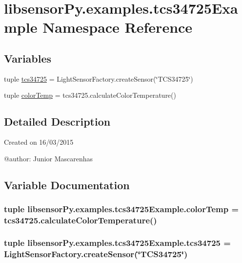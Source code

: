 \hypertarget{namespacelibsensorPy_1_1examples_1_1tcs34725Example}{}\section{libsensor\+Py.\+examples.\+tcs34725\+Example Namespace Reference}
\label{namespacelibsensorPy_1_1examples_1_1tcs34725Example}
\subsection*{Variables}
\begin{DoxyCompactItemize}
\item 
tuple \hyperlink{namespacelibsensorPy_1_1examples_1_1tcs34725Example_a263b5d30fd9292ed536653daa5a21f87}{tcs34725} = Light\+Sensor\+Factory.\+create\+Sensor(\char`\"{}T\+C\+S34725\char`\"{})
\item 
tuple \hyperlink{namespacelibsensorPy_1_1examples_1_1tcs34725Example_a19f4690c620a1ffea053bf068d11011b}{color\+Temp} = tcs34725.\+calculate\+Color\+Temperature()
\end{DoxyCompactItemize}


\subsection{Detailed Description}
\begin{DoxyVerb}Created on 16/03/2015

@author: Junior Mascarenhas
\end{DoxyVerb}
 

\subsection{Variable Documentation}
\hypertarget{namespacelibsensorPy_1_1examples_1_1tcs34725Example_a19f4690c620a1ffea053bf068d11011b}{}
\subsubsection[{color\+Temp}]{\setlength{\rightskip}{0pt plus 5cm}tuple libsensor\+Py.\+examples.\+tcs34725\+Example.\+color\+Temp = tcs34725.\+calculate\+Color\+Temperature()}\label{namespacelibsensorPy_1_1examples_1_1tcs34725Example_a19f4690c620a1ffea053bf068d11011b}
\hypertarget{namespacelibsensorPy_1_1examples_1_1tcs34725Example_a263b5d30fd9292ed536653daa5a21f87}{}
\subsubsection[{tcs34725}]{\setlength{\rightskip}{0pt plus 5cm}tuple libsensor\+Py.\+examples.\+tcs34725\+Example.\+tcs34725 = Light\+Sensor\+Factory.\+create\+Sensor(\char`\"{}T\+C\+S34725\char`\"{})}\label{namespacelibsensorPy_1_1examples_1_1tcs34725Example_a263b5d30fd9292ed536653daa5a21f87}
